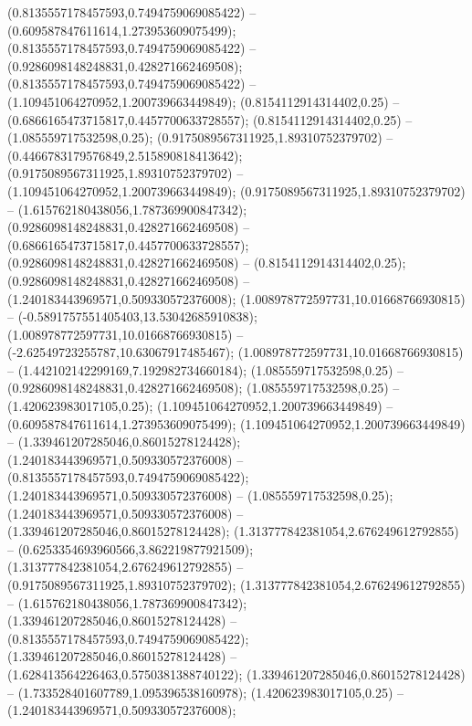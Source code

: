  (0.8135557178457593,0.7494759069085422) -- (0.609587847611614,1.273953609075499);
 (0.8135557178457593,0.7494759069085422) -- (0.9286098148248831,0.428271662469508);
 (0.8135557178457593,0.7494759069085422) -- (1.109451064270952,1.200739663449849);
 (0.8154112914314402,0.25) -- (0.6866165473715817,0.4457700633728557);
 (0.8154112914314402,0.25) -- (1.085559717532598,0.25);
 (0.9175089567311925,1.89310752379702) -- (0.4466783179576849,2.515890818413642);
 (0.9175089567311925,1.89310752379702) -- (1.109451064270952,1.200739663449849);
 (0.9175089567311925,1.89310752379702) -- (1.615762180438056,1.787369900847342);
 (0.9286098148248831,0.428271662469508) -- (0.6866165473715817,0.4457700633728557);
 (0.9286098148248831,0.428271662469508) -- (0.8154112914314402,0.25);
 (0.9286098148248831,0.428271662469508) -- (1.240183443969571,0.509330572376008);
 (1.008978772597731,10.01668766930815) -- (-0.5891757551405403,13.53042685910838);
 (1.008978772597731,10.01668766930815) -- (-2.62549723255787,10.63067917485467);
 (1.008978772597731,10.01668766930815) -- (1.442102142299169,7.192982734660184);
 (1.085559717532598,0.25) -- (0.9286098148248831,0.428271662469508);
 (1.085559717532598,0.25) -- (1.420623983017105,0.25);
 (1.109451064270952,1.200739663449849) -- (0.609587847611614,1.273953609075499);
 (1.109451064270952,1.200739663449849) -- (1.339461207285046,0.86015278124428);
 (1.240183443969571,0.509330572376008) -- (0.8135557178457593,0.7494759069085422);
 (1.240183443969571,0.509330572376008) -- (1.085559717532598,0.25);
 (1.240183443969571,0.509330572376008) -- (1.339461207285046,0.86015278124428);
 (1.313777842381054,2.676249612792855) -- (0.6253354693960566,3.862219877921509);
 (1.313777842381054,2.676249612792855) -- (0.9175089567311925,1.89310752379702);
 (1.313777842381054,2.676249612792855) -- (1.615762180438056,1.787369900847342);
 (1.339461207285046,0.86015278124428) -- (0.8135557178457593,0.7494759069085422);
 (1.339461207285046,0.86015278124428) -- (1.628413564226463,0.5750381388740122);
 (1.339461207285046,0.86015278124428) -- (1.733528401607789,1.095396538160978);
 (1.420623983017105,0.25) -- (1.240183443969571,0.509330572376008);

